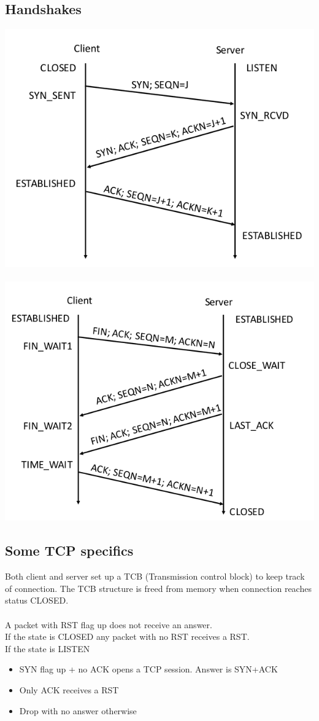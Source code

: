 \documentclass[10pt,a4paper]{book}
\begin{document}
\subsection{Handshakes}
\includegraphics[scale=0.5]{img/3-way.png}\\\\
\includegraphics[scale=0.5]{img/4-way.png}
\newpage
\subsection{Some TCP specifics}
Both client and server set up a TCB (Transmission control block) to keep track of connection. The TCB structure is freed from memory when connection reaches status CLOSED.\\\\
A packet with RST flag up does not receive an answer.\\
If the state is CLOSED any packet with no RST receives a RST.\\
If the state is LISTEN 
\begin{itemize}
\item SYN flag up + no ACK opens a TCP session. Answer is SYN+ACK
\item Only ACK receives a RST
\item Drop with no answer otherwise
\end{itemize}
\end{document}
